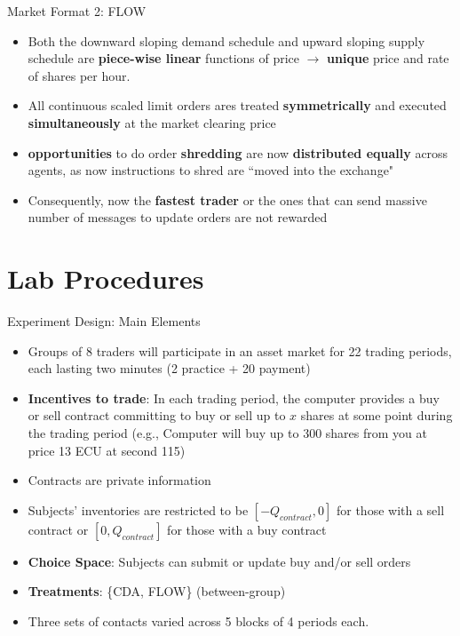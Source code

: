 \documentclass[10pt]{beamer}
\begin{document}
\begin{frame}{Market Format 2: FLOW}
\begin{itemize}
\item Both the downward sloping demand schedule and upward sloping supply schedule are \textbf{piece-wise linear} functions of price $\rightarrow$ \textbf{unique} price and rate of shares per hour. %
\item All continuous scaled limit orders ares treated \textbf{symmetrically} and executed \textbf{simultaneously} at the market clearing price %
        \item \textbf{opportunities} to do order \textbf{shredding} are now \textbf{distributed equally} across agents, as now instructions to shred are ``moved into the exchange" %
        \item Consequently, now the
        \textbf{fastest trader} or the ones that can send massive number of messages to update orders are not rewarded
    \end{itemize}
\end{frame}

\section{Lab Procedures}

\begin{frame}{Experiment Design: Main Elements}
    \begin{itemize}
        \item Groups of 8 traders will participate in an asset market for 22 trading periods, each lasting two minutes (2 practice + 20 payment)
        \item \textbf{Incentives to trade}: In each trading period, the computer provides a buy or sell contract committing to buy or sell up to $x$ shares at some point during the trading period (e.g., Computer will buy up to 300 shares from you at price 13 ECU at second 115) 
        \item Contracts are private information %
        \item Subjects' inventories are restricted to be $[-Q_{contract}, 0]$ for those with a sell contract or $[0, Q_{contract}]$ for those with a buy contract
        \item \textbf{Choice Space}: Subjects can submit or update buy and/or sell orders %
        \item \textbf{Treatments}: \{CDA, FLOW\} (between-group)
        \item Three sets of contacts varied across 5 blocks of 4 periods each. 
    \end{itemize}
\end{frame}
\end{document}
